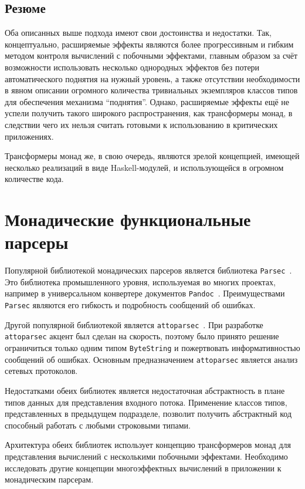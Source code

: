   \subsection{Резюме}

    Оба описанных выше подхода имеют свои достоинства и недостатки. Так, концептуально, 
    расширяемые эффекты являются более прогрессивным и гибким методом контроля 
    вычислений с побочными эффектами, главным образом за счёт возможности использовать   
    несколько однородных эффектов без потери автоматического поднятия на нужный уровень, 
    а также отсутствии необходимости в явном описании огромного количества тривиальных
    экземпляров классов типов для обеспечения механизма ``поднятия''.  
    Однако, расширяемые эффекты ещё не успели получить такого широкого распространения, 
    как трансформеры монад, в следствии чего их нельзя считать готовыми к использованию 
    в критических приложениях. 

    Трансформеры монад же, в свою очередь, являются зрелой концепцией, имеющей несколько
    реализаций в виде Haskell-модулей, и использующейся в огромном количестве кода. 

\section{Монадические функциональные парсеры}

  Популярной библиотекой монадических парсеров является библиотека
  \lstinline{Parsec}~\cite{parsec}. Это библиотека промышленного уровня,
  используемая во многих проектах, например в универсальном конвертере документов
  \lstinline{Pandoc}~\cite{pandoc}. Преимуществами \lstinline{Parsec} являются
   его гибкость и подробность сообщений об ошибках.

  Другой популярной библиотекой является
  \lstinline{attoparsec}~\cite{attoparsec}. При разработке
  \lstinline{attoparsec} акцент был сделан на скорость, поэтому было принято
  решение ограничиться только одним типом \lstinline{ByteString} и пожертвовать
  информативностью сообщений об ошибках. Основным предназначением
  \lstinline{attoparsec} является анализ сетевых протоколов.

  Недостатками обеих библиотек является недостаточная абстрактность в плане типов
  данных для представления входного потока. Применение классов типов,
  представленных в предыдущем подразделе, позволит получить абстрактный код
  способный работать с любыми строковыми типами.

  Архитектура обеих библиотек использует концепцию трансформеров монад для
  представления вычислений с несколькими побочными эффектами. Необходимо
  исследовать другие концепции многоэффектных вычислений в приложении к
  монадическим парсерам.

